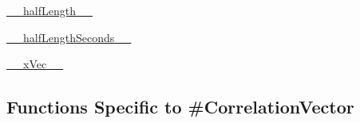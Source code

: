 \begin{DoxyCompactItemize}
\hyperlink{classmodest_1_1substates_1_1correlationvector_1_1CorrelationVector_a8eb5fd943e4bf6d3fea306bb15552075}{\+\_\+\+\_\+half\+Length\+\_\+\+\_\+}
\item 
\hyperlink{classmodest_1_1substates_1_1correlationvector_1_1CorrelationVector_a14a4e8c90f37c9c9d5392e03a61ff7a6}{\+\_\+\+\_\+half\+Length\+Seconds\+\_\+\+\_\+}
\item 
\hyperlink{classmodest_1_1substates_1_1correlationvector_1_1CorrelationVector_aadd6c074ce0e9cdc557a240e6a82230e}{\+\_\+\+\_\+x\+Vec\+\_\+\+\_\+}
\end{DoxyCompactItemize}
\subsection*{Functions Specific to \#Correlation\+Vector}
\label{_amgrpb77571167b4af2d56b573fb28e024ebf}%
